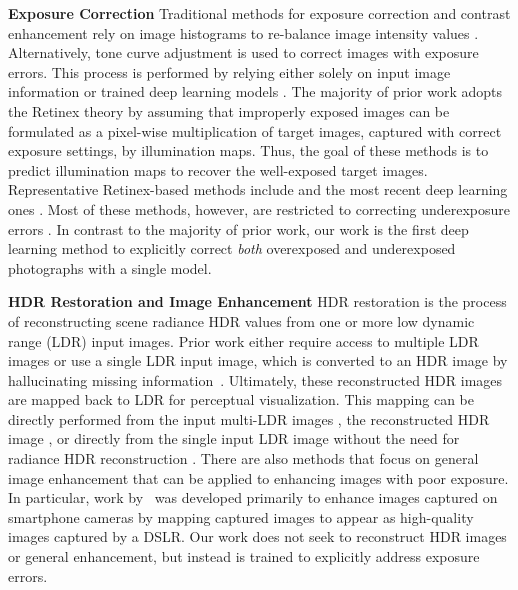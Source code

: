 \documentclass[final]{cvpr}
\begin{document}
\noindent\textbf{Exposure Correction }  Traditional methods for exposure correction and contrast enhancement rely on image histograms to re-balance image intensity values \cite{10.5555/559707, pizer1987adaptive, adaptivehisteq, 5773086, lee2013contrast}.  Alternatively,
tone curve adjustment is used to correct images with exposure errors. This process is performed by relying either solely on input image information \cite{yuan2012automatic} or trained deep learning models \cite{yu2018deepexposure, park2018distort, guo2020zero, moran2020deeplpf}.
The majority of prior work adopts the Retinex theory \cite{land1977retinex} by assuming that improperly exposed images can be formulated as a pixel-wise multiplication of target images, captured with correct exposure settings, by illumination maps. Thus, the goal of these methods is to predict illumination maps to recover the well-exposed target images. Representative Retinex-based methods include \cite{land1977retinex, jobson1997multiscale, wang2013naturalness, meylan2006high, guo2017lime, HQEC, zhang2019dual} and the most recent deep learning ones \cite{Chen2018Retinex, zhang2019kindling, DeepUPE}. Most of these methods, however, are restricted to correcting underexposure errors \cite{guo2017lime, HQEC, Chen2018Retinex, zhang2019kindling, DeepUPE, yang2020fidelity, xu2020learning, zhu2020eemefn}.
In contrast to the majority of prior work, our work is the first deep learning method to explicitly correct {\it both} overexposed and underexposed photographs with a single model.

\noindent\textbf{HDR Restoration and Image Enhancement } HDR restoration is the process of reconstructing scene radiance HDR values from one or more low dynamic range (LDR) input images. Prior work either require access to multiple LDR images \cite{mertens2009exposure, kalantari2017deep, endoSA2017} or use a single LDR input image, which is converted to an HDR image by hallucinating missing information~\cite{HDRCNN, moriwaki2018hybrid}.
Ultimately, these reconstructed HDR images are mapped back to LDR for perceptual visualization. This mapping can be directly performed from the input multi-LDR images \cite{debevec1997recovering,cai2018learning}, the reconstructed HDR image \cite{yang2018image}, or directly from the single input LDR image without the need for radiance HDR reconstruction \cite{HDRNET, DPE}.   There are also methods that focus on general image enhancement that can be applied to enhancing images with poor exposure.  In particular, work by~\cite{DPED, WESPE} was developed primarily to enhance images captured on smartphone cameras by mapping captured images to appear as high-quality images captured by a DSLR.  Our work does not seek to reconstruct HDR images or general enhancement, but instead is trained to explicitly address exposure errors.
\end{document}
